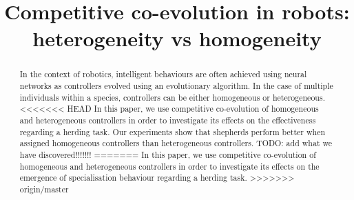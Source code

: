 \documentclass[conference]{IEEEtran}
\begin{document}
 
\title{Competitive co-evolution in robots: \\ heterogeneity vs homogeneity}



\author{
}



\maketitle


\begin{abstract}
In the context of robotics, intelligent behaviours are often achieved using neural networks as controllers evolved using  an evolutionary algorithm.
In the case of multiple individuals within a species, controllers can be either homogeneous or heterogeneous.
<<<<<<< HEAD
In this paper, we use competitive co-evolution of homogeneous and heterogeneous controllers in order to investigate its effects on the effectiveness regarding a herding task.
Our experiments show that shepherds perform better when assigned homogeneous controllers than heterogeneous controllers.
TODO: add what we have discovered!!!!!!!
=======
In this paper, we use competitive co-evolution of homogeneous and heterogeneous controllers in order to investigate its effects on the emergence of specialisation behaviour regarding a herding task.
>>>>>>> origin/master
\end{abstract}


\IEEEpeerreviewmaketitle
\end{document}
